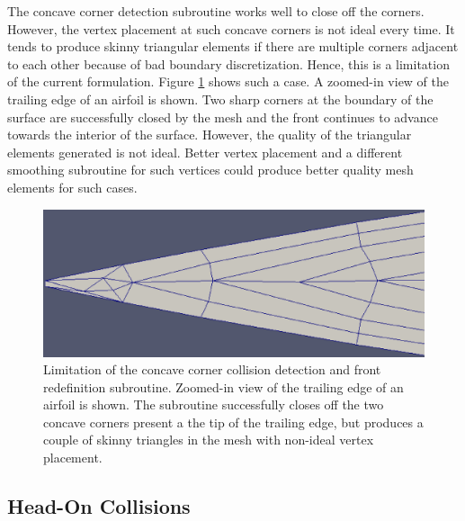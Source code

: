 The concave corner detection subroutine works well to close off the corners. However, the vertex placement at such concave corners is not ideal every time. It tends to produce skinny triangular elements if there are multiple corners adjacent to each other because of bad boundary discretization. Hence, this is a limitation of the current formulation. Figure \ref{fig-cornerLimitation} shows such a case. A zoomed-in view of the trailing edge of an airfoil is shown. Two sharp corners at the boundary of the surface are successfully closed by the mesh and the front continues to advance towards the interior of the surface. However, the quality of the triangular elements generated is not ideal. Better vertex placement and a different smoothing subroutine for such vertices could produce better quality mesh elements for such cases.

\begin{figure}
	\centering
	\includegraphics[width=0.4\linewidth]{img/m2/cornerCollision/cornerLimitation.eps}
	\caption[Limitation of the concave corner collision detection and front redefinition subroutine.]{Limitation of the concave corner collision detection and front redefinition subroutine. Zoomed-in view of the trailing edge of an airfoil is shown. The subroutine successfully closes off the two concave corners present a the tip of the trailing edge, but produces a couple of skinny triangles in the mesh with non-ideal vertex placement.}
	\label{fig-cornerLimitation}
\end{figure}

\subsection{Head-On Collisions}

